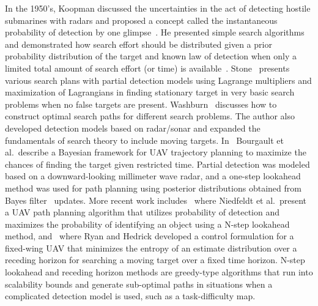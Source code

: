 In the 1950's, Koopman discussed the uncertainties in the act of detecting hostile submarines with radars and proposed a concept called the instantaneous probability of detection by one glimpse~\cite{Koopman1956Theory}. He presented simple search algorithms and demonstrated how search effort should be distributed given a prior probability distribution of the target and known law of detection when only a limited total amount of search effort (or time) is available~\cite{Koopman1957Theory}. Stone~\cite{Stone1975Theory} presents various search plans with partial detection models using Lagrange multipliers and maximization of Lagrangians in finding stationary target in very basic search problems when no false targets are present. Washburn~\cite{Washburn1981Search} discusses how to construct optimal search paths for different search problems. The author also developed detection models based on radar/sonar and expanded the fundamentals of search theory to include moving targets. In~\cite{Bourgault2006Optimal} Bourgault et al.\ describe a Bayesian framework for UAV trajectory planning to maximize the chances of finding the target given restricted time. Partial detection was modeled based on a downward-looking millimeter wave radar, and a one-step lookahead method was used for path planning using posterior distributions obtained from Bayes filter~\cite{Thrun2005Probabilistic} updates. More recent work includes~\cite{Niedfeldt2010integrated} where Niedfeldt et al.\ present a UAV path planning algorithm that utilizes probability of detection and maximizes the probability of identifying an object using a N-step lookahead method, and~\cite{Ryan2010particle} where Ryan and Hedrick developed a control formulation for a fixed-wing UAV that minimizes the entropy of an estimate distribution over a receding horizon for searching a moving target over a fixed time horizon. N-step lookahead and receding horizon methods are greedy-type algorithms that run into scalability bounds and generate sub-optimal paths in situations when a complicated detection model is used, such as a task-difficulty map.

